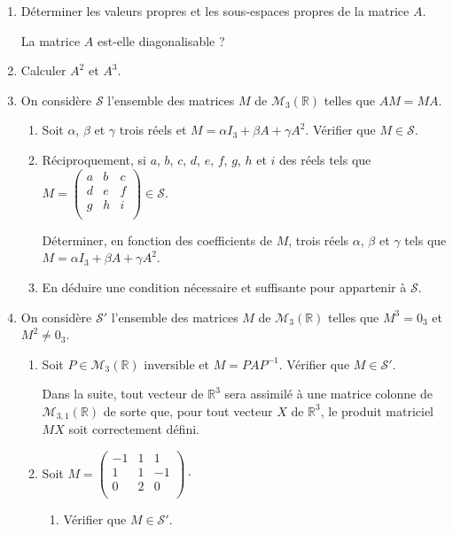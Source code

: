 \documentclass[twoside,french,11pt]{VcCours}
\begin{document}
  \begin{enumerate}
  \item Déterminer les valeurs propres et les sous-espaces propres de la matrice $A$.
  
  La matrice $A$ est-elle diagonalisable ?
  \item Calculer $A^2$ et $A^3$.
  \item On considère $\mathcal{S}$ l'ensemble des matrices $M$ de $\mathcal{M}_3(\mathbb{R})$ telles que $AM=MA$.
  \begin{enumerate}
  \item Soit $\alpha$, $\beta$ et $\gamma$ trois réels et $M=\alpha I_3 + \beta A + \gamma A^2$. Vérifier que $M \in \mathcal{S}$.
  \item Réciproquement, si $a$, $b$, $c$, $d$, $e$, $f$, $g$, $h$ et $i$ des réels tels que $M = \begin{pmatrix}
  a & b & c \\
  d & e & f \\
  g & h & i \\
  \end{pmatrix} \in \mathcal{S}$. 
  
  Déterminer, en fonction des coefficients de $M$, trois réels $\alpha$, $\beta$ et $\gamma$ tels que $M= \alpha I_3 + \beta A + \gamma A^2$.
  \item En déduire une condition nécessaire et suffisante pour appartenir à $\mathcal{S}$.
  \end{enumerate}
  
  \item On considère $\mathcal{S}'$ l'ensemble des matrices $M$ de $\mathcal{M}_3(\mathbb{R})$ telles que $M^3=0_3$ et $M^2 \neq 0_3$.
  \begin{enumerate}
  \item Soit $P \in \mathcal{M}_3(\mathbb{R})$ inversible et $M=PAP^{-1}$. Vérifier que $M \in \mathcal{S}'$.
  
  Dans la suite, tout vecteur de $\mathbb{R}^3$ sera assimilé à une matrice colonne de $\mathcal{M}_{3,1}(\mathbb{R})$ de sorte que, pour tout vecteur $X$ de $\mathbb{R}^3$, le produit matriciel $MX$ soit correctement défini.
  \item Soit $M = \begin{pmatrix}
  -1 & 1 & 1 \\
  1 & 1 & -1 \\
  0 & 2 & 0 \\
  \end{pmatrix} \cdot$
  \begin{enumerate}
  \item Vérifier que $M \in \mathcal{S}'$.
  

\end{enumerate}
\end{enumerate}
\end{enumerate}
\end{document}
